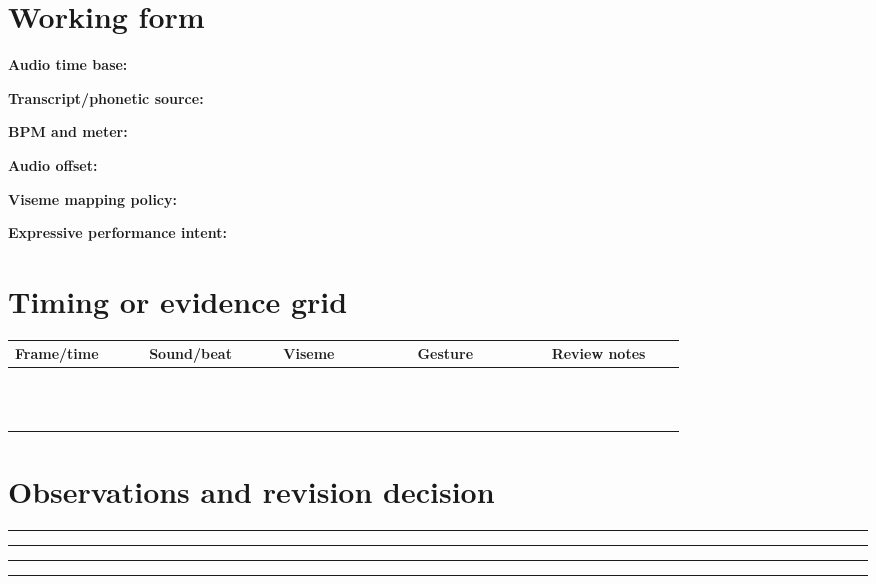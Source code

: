 \documentclass[10pt,letterpaper]{article}
\begin{document}
\section{Working form}
\noindent\textbf{Audio time base:}\quad\hrulefill\par\vspace{10pt}
\noindent\textbf{Transcript/phonetic source:}\quad\hrulefill\par\vspace{10pt}
\noindent\textbf{BPM and meter:}\quad\hrulefill\par\vspace{10pt}
\noindent\textbf{Audio offset:}\quad\hrulefill\par\vspace{10pt}
\noindent\textbf{Viseme mapping policy:}\quad\hrulefill\par\vspace{10pt}
\noindent\textbf{Expressive performance intent:}\quad\hrulefill\par\vspace{10pt}\section{Timing or evidence grid}
\begin{longtable}{|p{0.156\linewidth}|p{0.156\linewidth}|p{0.156\linewidth}|p{0.156\linewidth}|p{0.156\linewidth}|}
\hline
\textbf{Frame/time} & \textbf{Sound/beat} & \textbf{Viseme} & \textbf{Gesture} & \textbf{Review notes}\\\hline
\endhead
\rule{0pt}{20pt} &  &  &  & \\\hline
\rule{0pt}{20pt} &  &  &  & \\\hline
\rule{0pt}{20pt} &  &  &  & \\\hline
\rule{0pt}{20pt} &  &  &  & \\\hline
\rule{0pt}{20pt} &  &  &  & \\\hline
\rule{0pt}{20pt} &  &  &  & \\\hline
\rule{0pt}{20pt} &  &  &  & \\\hline
\rule{0pt}{20pt} &  &  &  & \\\hline
\rule{0pt}{20pt} &  &  &  & \\\hline
\rule{0pt}{20pt} &  &  &  & \\\hline
\rule{0pt}{20pt} &  &  &  & \\\hline
\rule{0pt}{20pt} &  &  &  & \\\hline
\end{longtable}
\section{Observations and revision decision}
\noindent\rule{\linewidth}{0.4pt}\par\vspace{18pt}\noindent\rule{\linewidth}{0.4pt}\par\vspace{18pt}\noindent\rule{\linewidth}{0.4pt}\par\vspace{18pt}\noindent\rule{\linewidth}{0.4pt}\par\vspace{18pt}
\end{document}
